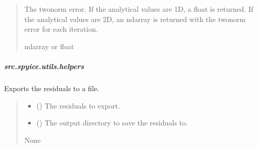 \documentclass[a4paper,11pt,english,openany]{sphinxmanual}
\begin{document}
\begin{fulllineitems}
\begin{fulllineitems}
\begin{quote}
\begin{description}
\sphinxAtStartPar
The two\sphinxhyphen{}norm error. If the analytical values are 1D, a float is returned.
If the analytical values are 2D, an ndarray is returned with the two\sphinxhyphen{}norm error for each iteration.

\sphinxAtStartPar
ndarray or float

\end{description}\end{quote}

\end{fulllineitems}


\end{fulllineitems}


\sphinxstepscope


\subparagraph{src.spyice.utils.helpers}
\label{\detokenize{api/spyice.utils.helpers:module-src.spyice.utils.helpers}}\label{\detokenize{api/spyice.utils.helpers:src-spyice-utils-helpers}}\label{\detokenize{api/spyice.utils.helpers::doc}}

\begin{fulllineitems}
\label{\detokenize{api/spyice.utils.helpers:src.spyice.utils.helpers.export_residuals}}
\pysigstartsignatures
\pysiglinewithargsret
{}
{\sphinxparamcomma {}\sphinxparamcomma {}\sphinxparamcomma {}\sphinxparamcomma {}\sphinxparamcomma {}}
{}
\pysigstopsignatures
\sphinxAtStartPar
Exports the residuals to a file.
\begin{quote}\begin{description}
\begin{itemize}
\item {} 
\sphinxAtStartPar
{} () \textendash{} The residuals to export.

\item {} 
\sphinxAtStartPar
{} () \textendash{} The output directory to save the residuals to.

\end{itemize}

\sphinxAtStartPar
None

\end{description}\end{quote}

\end{fulllineitems}
\end{document}
